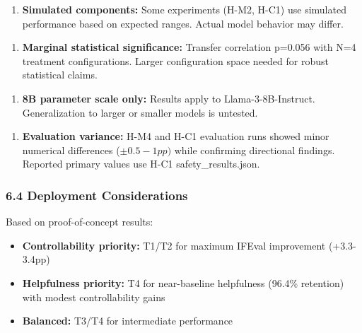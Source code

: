 \begin{enumerate}
\item \textbf{Simulated components:} Some experiments (H-M2, H-C1) use simulated performance based on expected ranges. Actual model behavior may differ.
\end{enumerate}

\begin{enumerate}
\item \textbf{Marginal statistical significance:} Transfer correlation p=0.056 with N=4 treatment configurations. Larger configuration space needed for robust statistical claims.
\end{enumerate}

\begin{enumerate}
\item \textbf{8B parameter scale only:} Results apply to Llama-3-8B-Instruct. Generalization to larger or smaller models is untested.
\end{enumerate}

\begin{enumerate}
\item \textbf{Evaluation variance:} H-M4 and H-C1 evaluation runs showed minor numerical differences ($\pm 0.5-1pp)$ while confirming directional findings. Reported primary values use H-C1 safety\_results.json.
\end{enumerate}

\subsubsection{6.4 Deployment Considerations}

Based on proof-of-concept results:
\begin{itemize}
\item \textbf{Controllability priority:} T1/T2 for maximum IFEval improvement (+3.3-3.4pp)
\item \textbf{Helpfulness priority:} T4 for near-baseline helpfulness (96.4\% retention) with modest controllability gains
\item \textbf{Balanced:} T3/T4 for intermediate performance
\end{itemize}
